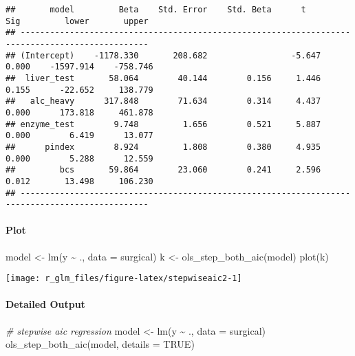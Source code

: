 \documentclass[
]{article}
\newenvironment{Shaded}{\begin{snugshade}}{\end{snugshade}}
\newcommand{\AttributeTok}[1]{\textcolor[rgb]{0.77,0.63,0.00}{#1}}
\newcommand{\CommentTok}[1]{\textcolor[rgb]{0.56,0.35,0.01}{\textit{#1}}}
\newcommand{\ConstantTok}[1]{\textcolor[rgb]{0.00,0.00,0.00}{#1}}
\newcommand{\FunctionTok}[1]{\textcolor[rgb]{0.00,0.00,0.00}{#1}}
\newcommand{\NormalTok}[1]{#1}
\newcommand{\OtherTok}[1]{\textcolor[rgb]{0.56,0.35,0.01}{#1}}
\newcommand{\SpecialCharTok}[1]{\textcolor[rgb]{0.00,0.00,0.00}{#1}}
\begin{document}
\begin{verbatim}
##       model         Beta    Std. Error    Std. Beta      t        Sig         lower       upper 
## ------------------------------------------------------------------------------------------------
## (Intercept)    -1178.330       208.682                 -5.647    0.000    -1597.914    -758.746 
##  liver_test       58.064        40.144        0.156     1.446    0.155      -22.652     138.779 
##   alc_heavy      317.848        71.634        0.314     4.437    0.000      173.818     461.878 
## enzyme_test        9.748         1.656        0.521     5.887    0.000        6.419      13.077 
##      pindex        8.924         1.808        0.380     4.935    0.000        5.288      12.559 
##         bcs       59.864        23.060        0.241     2.596    0.012       13.498     106.230 
## ------------------------------------------------------------------------------------------------
\end{verbatim}

\hypertarget{plot-7}{%
\paragraph{Plot}\label{plot-7}}

\begin{Shaded}
\begin{Highlighting}[]
\NormalTok{model }\OtherTok{\textless{}{-}} \FunctionTok{lm}\NormalTok{(y }\SpecialCharTok{\textasciitilde{}}\NormalTok{ ., }\AttributeTok{data =}\NormalTok{ surgical)}
\NormalTok{k }\OtherTok{\textless{}{-}} \FunctionTok{ols\_step\_both\_aic}\NormalTok{(model)}
\FunctionTok{plot}\NormalTok{(k)}
\end{Highlighting}
\end{Shaded}

\begin{center}\texttt{[image: r\_glm\_files/figure-latex/stepwiseaic2-1]} \end{center}

\hypertarget{detailed-output-5}{%
\paragraph{Detailed Output}\label{detailed-output-5}}

\begin{Shaded}
\begin{Highlighting}[]
\CommentTok{\# stepwise aic regression}
\NormalTok{model }\OtherTok{\textless{}{-}} \FunctionTok{lm}\NormalTok{(y }\SpecialCharTok{\textasciitilde{}}\NormalTok{ ., }\AttributeTok{data =}\NormalTok{ surgical)}
\FunctionTok{ols\_step\_both\_aic}\NormalTok{(model, }\AttributeTok{details =} \ConstantTok{TRUE}\NormalTok{)}
\end{Highlighting}
\end{Shaded}
\end{document}
